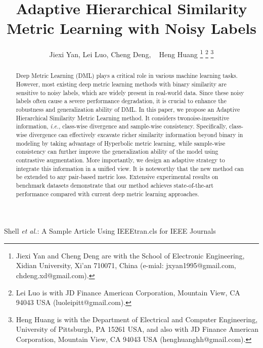 \documentclass[lettersize,journal]{IEEEtran}
\begin{document}
\title{Adaptive Hierarchical Similarity Metric Learning with Noisy Labels}

\author{Jiexi Yan, Lei Luo, Cheng Deng, ~ Heng Huang
\thanks{Jiexi Yan and Cheng Deng are with the School of Electronic Engineering, Xidian University, Xi'an 710071, China (e-mial: jxyan1995@gmail.com, chdeng.xd@gmail.com).}%
\thanks{Lei Luo is with JD Finance American Corporation, Mountain View, CA 94043 USA (luoleipitt@gmail.com).}
\thanks{Heng Huang is with the Department of Electrical and Computer Engineering, University of Pittsburgh, PA 15261 USA, and also with JD Finance American Corporation, Mountain View, CA 94043 USA (henghuanghh@gmail.com). }}

%
{Shell \MakeLowercase{\textit{et al.}}: A Sample Article Using IEEEtran.cls for IEEE Journals}


\maketitle

\begin{abstract}
Deep Metric Learning (DML) plays a critical role in various machine learning tasks.  However, most existing deep metric learning methods with binary similarity are sensitive to noisy labels, which are widely present in real-world data. Since these noisy labels often cause a severe performance degradation, it is crucial to enhance the robustness and generalization ability of DML. In this paper, we propose an Adaptive Hierarchical Similarity Metric Learning method. It considers twonoise-insensitive information, \textit{i.e.}, class-wise divergence and sample-wise consistency. Specifically, class-wise divergence can effectively excavate richer similarity information beyond binary in modeling by taking advantage of Hyperbolic metric learning, while sample-wise consistency can further improve the generalization ability of the model using contrastive augmentation. More importantly, we design an adaptive  strategy to integrate this information in a unified view. It is noteworthy that the new method can be extended to any pair-based metric loss. Extensive experimental results on benchmark datasets demonstrate that our method achieves state-of-the-art performance compared with current deep metric learning approaches.
\end{abstract}
\end{document}
